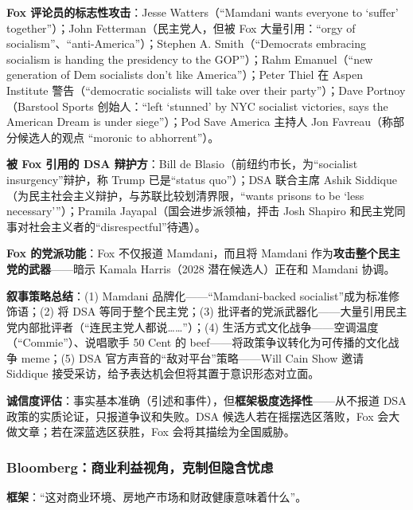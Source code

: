 \documentclass[12pt,a4paper]{ctexart}
\begin{document}
\textbf{Fox 评论员的标志性攻击}：Jesse Watters（``Mamdani wants everyone to `suffer' together''）；John Fetterman（民主党人，但被 Fox 大量引用：``orgy of socialism''、``anti-America''）；Stephen A. Smith（``Democrats embracing socialism is handing the presidency to the GOP''）；Rahm Emanuel（``new generation of Dem socialists don't like America''）；Peter Thiel 在 Aspen Institute 警告（``democratic socialists will take over their party''）；Dave Portnoy（Barstool Sports 创始人：``left `stunned' by NYC socialist victories, says the American Dream is under siege''）；Pod Save America 主持人 Jon Favreau（称部分候选人的观点 ``moronic to abhorrent''）。

\textbf{被 Fox 引用的 DSA 辩护方}：Bill de Blasio（前纽约市长，为``socialist insurgency''辩护，称 Trump 已是``status quo''）；DSA 联合主席 Ashik Siddique（为民主社会主义辩护，与苏联比较划清界限，``wants prisons to be `less necessary'''）；Pramila Jayapal（国会进步派领袖，抨击 Josh Shapiro 和民主党同事对社会主义者的``disrespectful''待遇）。

\textbf{Fox 的党派功能}：Fox 不仅报道 Mamdani，而且将 Mamdani 作为\textbf{攻击整个民主党的武器}——暗示 Kamala Harris（2028 潜在候选人）正在和 Mamdani 协调。

\textbf{叙事策略总结}：(1) Mamdani 品牌化——``Mamdani-backed socialist''成为标准修饰语；(2) 将 DSA 等同于整个民主党；(3) 批评者的党派武器化——大量引用民主党内部批评者（``连民主党人都说……''）；(4) 生活方式文化战争——空调温度（``Commie''）、说唱歌手 50 Cent 的 beef——将政策争议转化为可传播的文化战争 meme；(5) DSA 官方声音的``敌对平台''策略——Will Cain Show 邀请 Siddique 接受采访，给予表达机会但将其置于意识形态对立面。

\textbf{诚信度评估}：事实基本准确（引述和事件），但\textbf{框架极度选择性}——从不报道 DSA 政策的实质论证，只报道争议和失败。DSA 候选人若在摇摆选区落败，Fox 会大做文章；若在深蓝选区获胜，Fox 会将其描绘为全国威胁。

\subsubsection{Bloomberg：商业利益视角，克制但隐含忧虑}

\textbf{框架}：``这对商业环境、房地产市场和财政健康意味着什么''。
\end{document}
